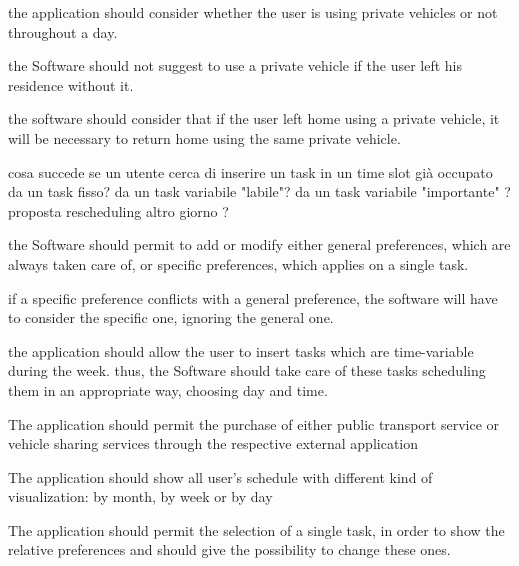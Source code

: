 \begin{requirementList}
    \item the application should consider whether the user is using private vehicles or not throughout a day. 
    \begin{enumerate}[label={[}R 11.\arabic*{]}:]
    \item the Software should not suggest to use a private vehicle if the user left his residence without it.
   
    \item the software should consider that if the user left home using a private vehicle, it will be necessary to return home using the same private vehicle.
    \end{enumerate} 
    \item cosa succede se un utente cerca di inserire un task in un time slot già occupato da un task fisso? da un task variabile "labile"? da un task variabile "importante" ? proposta rescheduling altro giorno ?
    
    \item the Software should permit to add or modify either general preferences, which are always taken care of, or specific preferences, which applies on a single task.
    \begin{enumerate}[label={[}R 13.\arabic*{]}:]
    \item if a specific preference conflicts with a general preference, the software will have to consider the specific one, ignoring the general one.
    \end{enumerate}
    
    \item the application should allow the user to insert tasks which are time-variable during the week. thus, the Software should take care of these tasks scheduling them in an appropriate way, choosing day and time.
    
    \item The application should permit the purchase of either public transport service or vehicle sharing services through the respective external application
    
    \item The application should show all user's schedule with different kind of visualization: by month, by week or by day
    
    \item The application should permit the selection of a single task, in order to show the relative preferences and should give the possibility to change these ones.
    

\end{requirementList}
